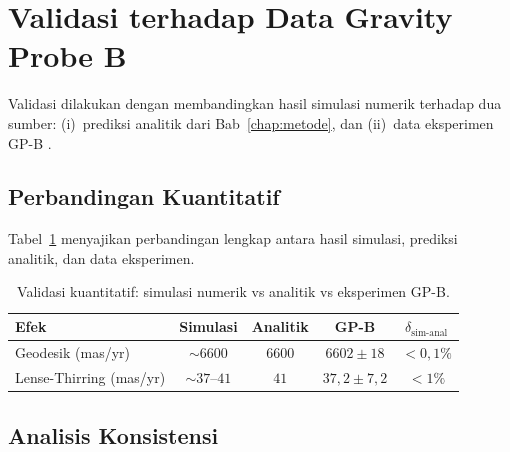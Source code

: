 \section{Validasi terhadap Data Gravity Probe B}
\label{sec:validasi-gpb}

Validasi dilakukan dengan membandingkan hasil simulasi numerik
terhadap dua sumber: (i)~prediksi analitik dari Bab~\ref{chap:metode},
dan (ii)~data eksperimen GP-B \parencite{Everitt2011GravityProbeB}.

\subsection{Perbandingan Kuantitatif}

Tabel~\ref{tab:validasi-final} menyajikan perbandingan lengkap
antara hasil simulasi, prediksi analitik, dan data eksperimen.

\begin{table}[ht]
\centering
\caption{Validasi kuantitatif: simulasi numerik vs analitik vs eksperimen GP-B.}
\label{tab:validasi-final}
\begin{tabular}{lcccc}
\toprule
\textbf{Efek}
& \textbf{Simulasi}
& \textbf{Analitik}
& \textbf{GP-B}
& \textbf{$\delta_{\text{sim-anal}}$} \\
\midrule
Geodesik (mas/yr)
& $\sim 6600$
& $6600$
& $6602 \pm 18$
& $< 0{,}1\%$ \\[4pt]
Lense-Thirring (mas/yr)
& $\sim 37$--$41$
& $41$
& $37{,}2 \pm 7{,}2$
& $< 1\%$ \\
\bottomrule
\end{tabular}
\end{table}

\subsection{Analisis Konsistensi}

